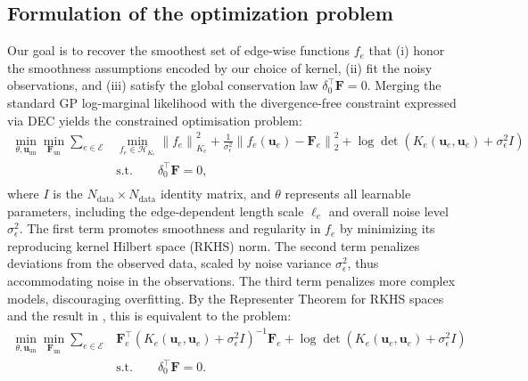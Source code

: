 \documentclass{article}
\theoremstyle{definition}
\theoremstyle{remark}
\newcommand{\norm}[1]{\left \lVert #1 \right \rVert}
\begin{document}
\subsection{Formulation of the optimization problem}
Our goal is to recover the smoothest set of edge-wise functions $f_e$ that (i) honor the smoothness assumptions encoded by our choice of kernel, (ii) fit the noisy observations, and (iii) satisfy the global conservation law $\delta_0^\intercal\mathbf{F}=0$. Merging the standard GP log-marginal likelihood with the divergence-free constraint expressed via DEC yields the constrained optimisation problem:
\begin{equation} \begin{split} 
	\min_{\theta, \mathbf{u}_\text{un}} \min_{\mathbf{F}_\text{un}} \sum_{e \in \mathcal{E}} &\min_{f_e \in \mathcal{H}_{K_e}}   \norm{ f_e }_{K_e}^2 + \frac{1}{\sigma_{\epsilon}^2} \norm{ f_e(\mathbf{u}_e ) - \mathbf{F}_e }_2^2 + \log \det (K_e(\mathbf{u}_e, \mathbf{u}_e ) + \sigma_{\epsilon}^2 I) \\
	&\text{s.t.}\qquad \delta_0 ^\intercal \mathbf{F} = 0,\\
\end{split}\label{prob:gp-recovery} \end{equation}
where $I$ is the $N_\text{data} \times N_\text{data}$ identity matrix, and $\theta$ represents all learnable parameters, including the edge-dependent length scale $\ell_e$ and overall noise level $\sigma_{\epsilon}^2$. The first term promotes smoothness and regularity  in $f_e$ by minimizing its reproducing kernel Hilbert space (RKHS) norm. The second term penalizes deviations from the observed data, scaled by noise variance $\sigma_{\epsilon}^2$, thus accommodating noise in the observations. The third term penalizes more complex models, discouraging overfitting. By the Representer Theorem for RKHS spaces and the result in , this is equivalent to the problem:
\begin{equation} \begin{split}
	\min_{\theta, \mathbf{u}_\text{un}} \min_{\mathbf{F}_\text{un}}  \sum_{e \in \mathcal{E}} & \mathbf{F}_e^\intercal (K_e(  \mathbf{u}_e,  \mathbf{u}_e) + \sigma_{\epsilon}^2 I)^{-1} \mathbf{F}_e  + \log \det (K_e( \mathbf{u}_e,  \mathbf{u}_e) + \sigma_{\epsilon}^2 I)\\
	&\text{s.t.} \qquad \delta_0 ^\intercal \mathbf{F} = 0.\\
\end{split} \label{prob:gp-representer} \end{equation}
\end{document}
